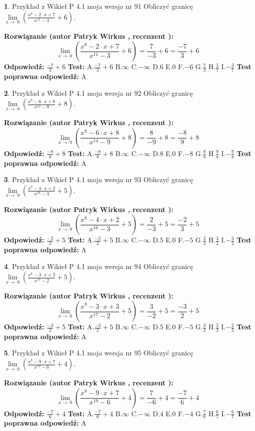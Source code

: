 \documentclass[12pt, a4paper]{article}
\theoremstyle{definition} %
\newtheorem{zad}{}
\newcommand{\zadStart}[1]{\begin{zad}#1\newline}
\newcommand{\zadStop}{\end{zad}}
\newcommand{\rozwStart}[2]{\noindent \textbf{Rozwiązanie (autor #1 , recenzent #2): }\newline}
\newcommand{\rozwStop}{\newline}
\newcommand{\odpStart}{\noindent \textbf{Odpowiedź:}\newline}
\newcommand{\odpStop}{\newline}
\newcommand{\testStart}{\noindent \textbf{Test:}\newline}
\newcommand{\testStop}{\newline}
\newcommand{\kluczStart}{\noindent \textbf{Test poprawna odpowiedź:}\newline}
\newcommand{\kluczStop}{\newline}
\begin{document}
\zadStart{Przykład z Wikieł P 4.1 moja wersja nr 91}
Obliczyć granicę $\lim\limits_{x\to\ 0}(\frac{x^{8}-2 \cdot x +7}{x^{11}-3}+6)$.
\zadStop
\rozwStart{Patryk Wirkus}{}
$$\lim\limits_{x\to\ 0}(\frac{x^{8}-2 \cdot x +7}{x^{11}-3}+6)=\frac{7}{-3}+6=\frac{-7}{3}+6$$
\rozwStop
\odpStart
$\frac{-7}{3}+6$
\odpStop
\testStart
A.$\frac{-7}{3}+6$
B.$\infty$
C.$-\infty$
D.$6$
E.$0$
F.$-6$
G.$\frac{7}{3}$
H.$\frac{3}{7}$
I.$-\frac{3}{7}$
\testStop
\kluczStart
A
\kluczStop



\zadStart{Przykład z Wikieł P 4.1 moja wersja nr 92}
Obliczyć granicę $\lim\limits_{x\to\ 0}(\frac{x^{8}-6 \cdot x +8}{x^{14}-9}+8)$.
\zadStop
\rozwStart{Patryk Wirkus}{}
$$\lim\limits_{x\to\ 0}(\frac{x^{8}-6 \cdot x +8}{x^{14}-9}+8)=\frac{8}{-9}+8=\frac{-8}{9}+8$$
\rozwStop
\odpStart
$\frac{-8}{9}+8$
\odpStop
\testStart
A.$\frac{-8}{9}+8$
B.$\infty$
C.$-\infty$
D.$8$
E.$0$
F.$-8$
G.$\frac{8}{9}$
H.$\frac{9}{8}$
I.$-\frac{9}{8}$
\testStop
\kluczStart
A
\kluczStop



\zadStart{Przykład z Wikieł P 4.1 moja wersja nr 93}
Obliczyć granicę $\lim\limits_{x\to\ 0}(\frac{x^{8}-4 \cdot x +2}{x^{16}-3}+5)$.
\zadStop
\rozwStart{Patryk Wirkus}{}
$$\lim\limits_{x\to\ 0}(\frac{x^{8}-4 \cdot x +2}{x^{16}-3}+5)=\frac{2}{-3}+5=\frac{-2}{3}+5$$
\rozwStop
\odpStart
$\frac{-2}{3}+5$
\odpStop
\testStart
A.$\frac{-2}{3}+5$
B.$\infty$
C.$-\infty$
D.$5$
E.$0$
F.$-5$
G.$\frac{2}{3}$
H.$\frac{3}{2}$
I.$-\frac{3}{2}$
\testStop
\kluczStart
A
\kluczStop



\zadStart{Przykład z Wikieł P 4.1 moja wersja nr 94}
Obliczyć granicę $\lim\limits_{x\to\ 0}(\frac{x^{8}-3 \cdot x +3}{x^{17}-2}+5)$.
\zadStop
\rozwStart{Patryk Wirkus}{}
$$\lim\limits_{x\to\ 0}(\frac{x^{8}-3 \cdot x +3}{x^{17}-2}+5)=\frac{3}{-2}+5=\frac{-3}{2}+5$$
\rozwStop
\odpStart
$\frac{-3}{2}+5$
\odpStop
\testStart
A.$\frac{-3}{2}+5$
B.$\infty$
C.$-\infty$
D.$5$
E.$0$
F.$-5$
G.$\frac{3}{2}$
H.$\frac{2}{3}$
I.$-\frac{2}{3}$
\testStop
\kluczStart
A
\kluczStop



\zadStart{Przykład z Wikieł P 4.1 moja wersja nr 95}
Obliczyć granicę $\lim\limits_{x\to\ 0}(\frac{x^{8}-9 \cdot x +7}{x^{19}-6}+4)$.
\zadStop
\rozwStart{Patryk Wirkus}{}
$$\lim\limits_{x\to\ 0}(\frac{x^{8}-9 \cdot x +7}{x^{19}-6}+4)=\frac{7}{-6}+4=\frac{-7}{6}+4$$
\rozwStop
\odpStart
$\frac{-7}{6}+4$
\odpStop
\testStart
A.$\frac{-7}{6}+4$
B.$\infty$
C.$-\infty$
D.$4$
E.$0$
F.$-4$
G.$\frac{7}{6}$
H.$\frac{6}{7}$
I.$-\frac{6}{7}$
\testStop
\kluczStart
A
\kluczStop
\end{document}
